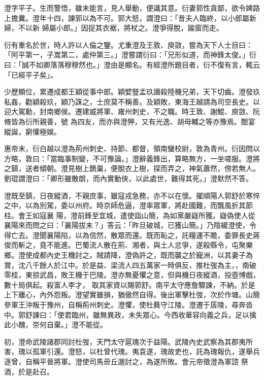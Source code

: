 \begin{pinyinscope}
 澄字平子。生而警悟，雖未能言，見人舉動，便識其意。衍妻郭性貪鄙，欲令婢路上擔糞。澄年十四，諫郭以為不可。郭大怒，謂澄曰：「昔夫人臨終，以小郎屬新婦，不以新
 婦屬小郎。」因捉其衣裾，將杖之。澄爭得脫，踰窗而走。



 衍有重名於世，時人許以人倫之鑒。尤重澄及王敦、庾敳，嘗為天下人士目曰：「阿平第一，子嵩第二，處仲第三。」澄嘗謂衍曰：「兄形似道，而神鋒太俊。」衍曰：「誠不如卿落落穆穆然也。」澄由是顯名。有經澄所題目者，衍不復有言，輒云「已經平子矣」。



 少歷顯位，累遷成都王穎從事中郎。穎嬖豎孟玖譖殺陸機兄弟，天下切齒。澄發玖私姦，勸穎殺玖，穎乃誅之，士庶莫不稱善。及穎敗，東海王越請為司空長史。以迎大駕勳，封南鄉侯。遷建威將軍、雍州刺史，不之職。時王敦、謝鯤、庾敳、阮脩皆為衍所親善，號
 為四友，而亦與澄狎，又有光逸、胡毋輔之等亦豫焉。酣宴縱誕，窮懽極娛。



 惠帝末，衍白越以澄為荊州刺史、持節、都督，領南蠻校尉，敦為青州。衍因問以方略，敦曰：「當臨事制變，不可豫論。」澄辭義鋒出，算略無方，一坐嗟服。澄將之鎮，送者傾朝。澄見樹上鵲巢，便脫衣上樹，探而弄之，神氣蕭然，傍若無人。劉琨謂澄曰：「卿形雖散朗，而內實動俠，以此處世，難得其死。」澄默然不答。



 澄既至鎮，日夜縱酒，不親庶事，雖寇戎急務，亦不以在懷。擢順陽人郭舒於寒悴之中，以為別駕，委以州府。時京師危逼，澄率眾軍，將赴國難，而飄風折其節柱。會王如寇襄
 陽，澄前鋒至宜城，遣使詣山簡，為如黨嚴嶷所獲。嶷偽使人從襄陽來而問之曰：「襄陽拔未？」答云：「昨旦破城，已獲山簡。」乃陰緩澄使，令得亡去。澄聞襄陽陷，以為信然，散眾而還。既而恥之，託糧運不贍，委罪長史蔣俊而斬之，竟不能進。巴蜀流人散在荊、湘者，與土人忿爭，遂殺縣令，屯聚樂鄉。澄使成都內史王機討之。賊請降，澄偽許之，既而襲之於寵洲，以其妻子為賞，沈八千餘人於江中。於是益、梁流人四五萬家一時俱反，推杜弢為主，，南破零桂，東掠武昌，敗王機于巴陵。澄亦無憂懼之意，但與機日夜縱酒，投壺博戲，數十局俱起。殺富人李才，
 取其家資以賜郭舒。南平太守應詹驟諫，不納。於是上下離心，內外怨叛。澄望實雖損，猶傲然自得。後出軍擊杜弢，次於作塘。山簡參軍王沖叛于豫州，自稱荊州刺史。澄懼，使杜蕤守江陵。澄遷于孱陵，尋奔沓中。郭舒諫曰：「使君臨州，雖無異政，未失眾心。今西收華容向義之兵，足以擒此小醜，奈何自棄。」澄不能從。



 初，澄命武陵諸郡同討杜弢，天門太守扈瑰次于益陽。武陵內史武察為其郡夷所害，瑰以孤軍引還。澄怒，以杜曾代瑰。夷袁遂，瑰故吏也，託為瑰報仇，遂舉兵逐曾，自稱平晉將軍。澄使司馬毌丘邈討之，為遂所敗。會元帝徵澄為軍諮
 祭酒，於是赴召。




\end{pinyinscope}
